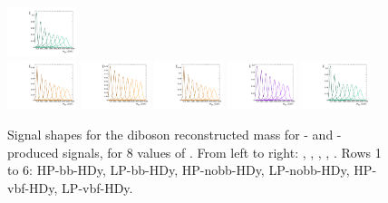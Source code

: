 \begin{figure}[htbp]
  \includegraphics[width=0.18\textwidth]{fig/2Dfit/templateSignalVsMX_fromDC_WprToWH_MVV_mu_HP_vbf_HDy.pdf}\\
  \includegraphics[width=0.18\textwidth]{fig/2Dfit/templateSignalVsMX_fromDC_GbuToWW_MVV_mu_LP_vbf_HDy.pdf}
  \includegraphics[width=0.18\textwidth]{fig/2Dfit/templateSignalVsMX_fromDC_RadToWW_MVV_mu_LP_vbf_HDy.pdf}
  \includegraphics[width=0.18\textwidth]{fig/2Dfit/templateSignalVsMX_fromDC_ZprToWW_MVV_mu_LP_vbf_HDy.pdf}
  \includegraphics[width=0.18\textwidth]{fig/2Dfit/templateSignalVsMX_fromDC_WprToWZ_MVV_mu_LP_vbf_HDy.pdf}
  \includegraphics[width=0.18\textwidth]{fig/2Dfit/templateSignalVsMX_fromDC_WprToWH_MVV_mu_LP_vbf_HDy.pdf}\\
  \caption{
    Signal shapes for the diboson reconstructed mass \MVV for \ggF- and \DY-produced signals, for 8 values of \MX.
    From left to right: \GBulktoWW, \RadtoWW, \ZprtoWW, \WprtoWZ, \WprtoWH.
    Rows 1 to 6: HP-bb-HDy, LP-bb-HDy, HP-nobb-HDy, LP-nobb-HDy, HP-vbf-HDy, LP-vbf-HDy.
  }
  \label{fig:MVVShapes_NonVBF_HDy_Run2}
\end{figure}


